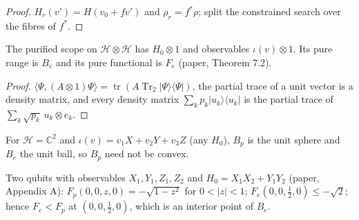 \begin{proof}
  \leanok
  $H_r(v')=H(v_0+fv')$ and $\rho_r=f^*\rho$; split the constrained search over the fibres of $f^*$.
\end{proof}

\begin{theorem}[Purification]\label{thm:scope-purification}
  \leanok
  The purified scope on $\mathcal H\otimes\mathcal H$ has $H_0\otimes1$ and observables $\iota(v)\otimes1$. Its pure range is $B_e$ and its pure
  functional is $F_e$ (paper, Theorem 7.2).
\end{theorem}

\begin{proof}
  \leanok
  $\langle\Psi,(A\otimes1)\Psi\rangle=\operatorname{tr}(A\operatorname{Tr}_2|\Psi\rangle\langle\Psi|)$, the partial trace of a unit vector is a density matrix, and every
  density matrix $\sum_kp_k|u_k\rangle\langle u_k|$ is the partial trace of $\sum_k\sqrt{p_k}\,u_k\otimes e_k$.
\end{proof}

\begin{theorem}\label{thm:scope-examples}
  \leanok
  For $\mathcal H=\mathbb C^2$ and $\iota(v)=v_1X+v_2Y+v_3Z$ (any $H_0$), $B_p$ is the unit sphere and $B_e$ the unit ball, so $B_p$ need not be
  convex.
\end{theorem}

\begin{theorem}\label{thm:scope-double-qubit}
  \leanok
  Two qubits with observables $X_1,Y_1,Z_1,Z_2$ and $H_0=X_1X_2+Y_1Y_2$ (paper, Appendix A): $F_p(0,0,z,0)=-\sqrt{1-z^2}$ for
  $0<|z|<1$; $F_e(0,0,\tfrac12,0)\le-\sqrt2$; hence $F_e<F_p$ at $(0,0,\tfrac12,0)$, which is an interior point of $B_e$.
\end{theorem}

